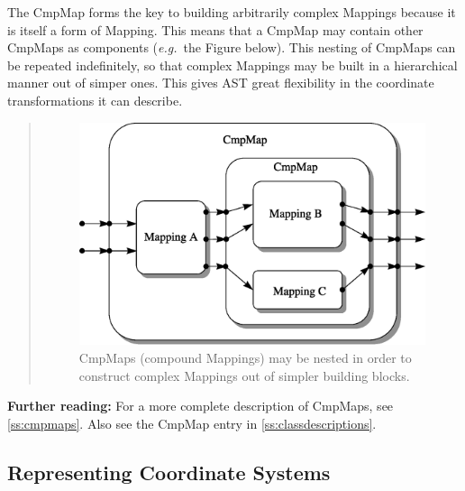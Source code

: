 \documentclass[twoside,11pt]{article}
\newcommand{\appref}[1]{Appendix~\ref{#1}}
\newcommand{\secref}[1]{\S\ref{#1}}
\renewcommand{\appref}[1]{\ref{#1}}
\renewcommand{\secref}[1]{\ref{#1}}
\begin{document}
\begin{htmlonly}
   The CmpMap forms the key to building arbitrarily complex Mappings
   because it is itself a form of Mapping. This means that a CmpMap may
   contain other CmpMaps as components ({\em{e.g.}}\ the Figure
   below). This nesting of CmpMaps can be repeated indefinitely, so that
   complex Mappings may be built in a hierarchical manner out of simper
   ones.  This gives AST great flexibility in the coordinate
   transformations it can describe.
   \begin{quote}
   \begin{figure}
   \label{fig:complexcmpmap}
   \includegraphics[scale=0.8]{sun211_figures/complex.eps}
   \caption{CmpMaps (compound Mappings) may be nested in order to
   construct complex Mappings out of simpler building blocks.}
   \end{figure}
   \end{quote}
\end{htmlonly}

{\bf{Further reading:}} For a more complete description of CmpMaps,
see \secref{ss:cmpmaps}. Also see the CmpMap entry in
\appref{ss:classdescriptions}.

\subsection{Representing Coordinate Systems}
\end{document}
